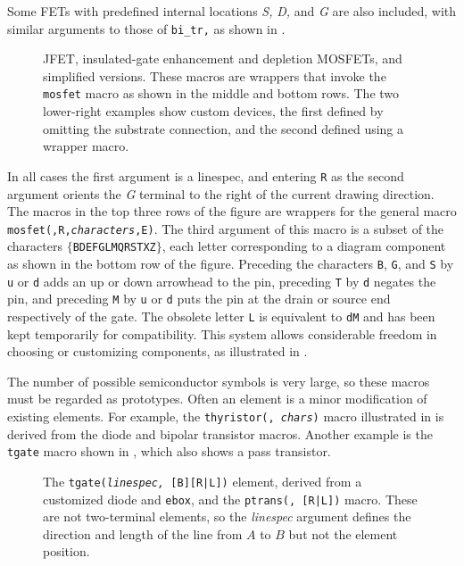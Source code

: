 Some FETs with predefined internal locations {\sl S,} {\sl D,} and {\sl G} are
also included, with similar arguments to those of {\tt bi\_tr,} as shown in
.
\begin{figure}[h!t]
   
   \caption{JFET, insulated-gate enhancement and depletion MOSFETs,
     and simplified versions.
     These macros are wrappers that invoke the {\tt mosfet}
     macro as shown in the middle and bottom rows.
     The two lower-right examples show custom devices, the first
     defined by omitting the substrate connection, and the second
     defined using a wrapper macro.}
   \label{fet}
   \end{figure}
In all cases the first argument is a linespec,
and entering
{\tt R} as the second argument orients the {\sl G} terminal to the right of the
current drawing direction.
The macros in the top three rows of the figure are wrappers for the
general macro {\tt mosfet(\linespec,R,{\sl characters},E)}.
The third argument of this macro is a subset of the characters
$\{${\tt BDEFGLMQRSTXZ}$\}$, each letter corresponding to
a diagram component as shown in the bottom row of the figure. 
Preceding the characters {\tt B}, {\tt G}, and {\tt S} by {\tt u} or {\tt d}
adds an up or down arrowhead to the pin, preceding {\tt T} by {\tt d}
negates the pin, and preceding {\tt M} by {\tt u} or {\tt d} puts the pin
at the drain or source end respectively of the gate.
The obsolete letter {\tt L} is equivalent to {\tt dM} and has been kept
temporarily for compatibility.
This system allows considerable freedom in choosing or customizing components,
as illustrated in .

The number of possible semiconductor symbols is very
large, so these macros must be regarded as prototypes.
Often an element is a minor modification of existing elements.  For example,
the {\tt thyristor(\linespec, {\sl chars})} macro illustrated in
 is derived from the diode and bipolar transistor macros.
Another example is the {\tt tgate} macro shown in , which
also shows a pass transistor.
\begin{figure}[h!t]
   
   \caption{The {\tt tgate({\sl linespec,} [B][R|L])} element, derived from
     a customized diode and {\tt ebox}, and the
     {\tt ptrans(\linespec, [R|L])} macro.
     These are not two-terminal elements, so the {\sl linespec} argument
     defines the direction and length of the line from $A$ to $B$ but not
     the element position.}
   \label{Tgate}
   \end{figure}


